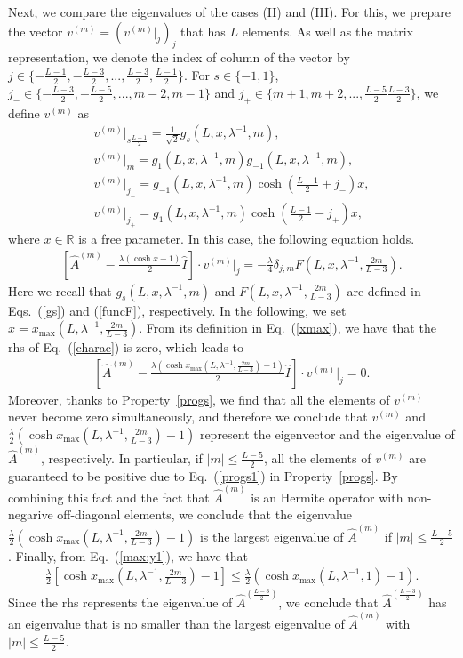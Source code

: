 \documentclass[prl,twocolumn,superscriptaddress,nofootinbib]{revtex4}
\begin{document}
\begin{widetext}
Next, we compare the eigenvalues of the cases (II) and (III). 
For this, we prepare the vector $v^{(m)}=(v^{(m)}|_j)_j$ that has $L$ elements. 
As well as the matrix representation, we denote the index of column of the vector by 
$j\in\{-\frac{L-1}{2},-\frac{L-3}{2},...,\frac{L-3}{2},\frac{L-1}{2}\}$.
For $s\in\{-1,1\}$, $j_-\in\{-\frac{L-3}{2},-\frac{L-5}{2},...,m-2,m-1\}$ and $j_+\in\{m+1,m+2,...,\frac{L-5}{2}\frac{L-3}{2}\}$, 
we define $v^{(m)}$ as
\begin{align}
  v^{(m)}|_{s\frac{L-1}{2}}=\frac{1}{\sqrt{2}}g_s(L,x,\lambda^{-1},m),\\
  v^{(m)}|_m=g_1(L,x,\lambda^{-1},m)g_{-1}(L,x,\lambda^{-1},m),\\
  v^{(m)}|_{j_-}=g_{-1}(L,x,\lambda^{-1},m)\cosh\left(\frac{L-1}{2}+j_-\right)x,\\
  v^{(m)}|_{j_+}=g_1(L,x,\lambda^{-1},m)\cosh\left(\frac{L-1}{2}-j_+\right)x,
\end{align}
where $x\in\mathbb{R}$ is a free parameter.
In this case, the following equation holds.
\begin{align}
  \left[\hat{A}^{(m)}-\frac{\lambda(\cosh x-1)}{2}\hat{I}\right]\cdot v^{(m)}|_j=
  -\frac{\lambda}{4}\delta_{j,m}F\left(L,x,\lambda^{-1},\frac{2m}{L-3}\right).
  \label{charac}
\end{align}
Here we recall that $g_{s}(L,x,\lambda^{-1},m)$ and $F(L,x,\lambda^{-1},\frac{2m}{L-3})$ are defined in Eqs.~(\ref{gs}) and
(\ref{funcF}), respectively. 
In the following, we set $x=x_{\max}(L,\lambda^{-1},\frac{2m}{L-3})$.
From its definition in Eq.~(\ref{xmax}), we have that the rhs of Eq.~(\ref{charac}) is zero, which leads to
\begin{align}
  \left[\hat{A}^{(m)}-\frac{\lambda(\cosh x_{\max}(L,\lambda^{-1},\frac{2m}{L-3})-1)}{2}\hat{I}\right]\cdot v^{(m)}|_j=0.
\end{align}
Moreover, thanks to Property~\ref{progs}, we find that all the elements of $v^{(m)}$ never become zero simultaneously, and
therefore we conclude that $v^{(m)}$ and $\frac{\lambda}{2}(\cosh x_{\max}(L,\lambda^{-1},\frac{2m}{L-3})-1)$
represent the eigenvector and the eigenvalue of $\hat{A}^{(m)}$, respectively. 
In particular, if $|m|\leq\frac{L-5}{2}$,
all the elements of $v^{(m)}$ are guaranteed to be positive due to Eq.~(\ref{progs1}) in Property~\ref{progs}. 
By combining this fact and the fact that $\hat{A}^{(m)}$ is an Hermite operator with non-negarive off-diagonal elements, 
we conclude that the eigenvalue $\frac{\lambda}{2}(\cosh x_{\max}(L,\lambda^{-1},\frac{2m}{L-3})-1)$
is the largest eigenvalue of $\hat{A}^{(m)}$ if $|m|\leq\frac{L-5}{2}$. 
Finally, from Eq.~(\ref{max:y1}), we have that
\begin{align}
  \frac{\lambda}{2}\left[\cosh x_{\max}\left(L,\lambda^{-1},\frac{2m}{L-3}\right)-1\right]
  \leq \frac{\lambda}{2}(\cosh x_{\max}(L,\lambda^{-1},1)-1). 
  \end{align}
Since the rhs represents the eigenvalue of $\hat{A}^{(\frac{L-3}{2})}$, we conclude that
$\hat{A}^{(\frac{L-3}{2})}$ has an eigenvalue that is no smaller than the largest eigenvalue of $\hat{A}^{(m)}$ with 
$|m|\leq \frac{L-5}{2}$. 





\end{widetext}


\end{document}
